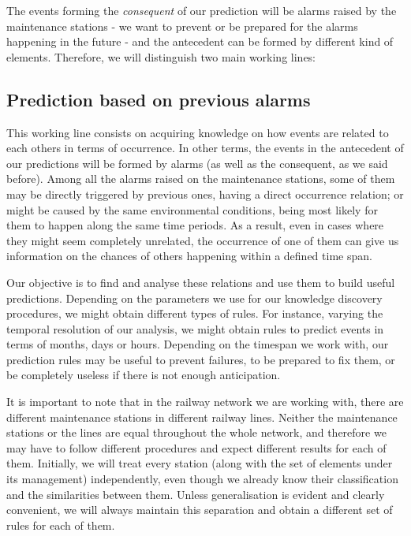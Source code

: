 \documentclass[a4paper,10pt]{report}
\begin{document}
The events forming the \emph{consequent} of our prediction will be alarms raised by the maintenance stations - we want to prevent or be prepared for the alarms happening in the future - and the antecedent can be formed by different kind of elements. Therefore, we will distinguish two main working lines:


\subsection{Prediction based on previous alarms}\label{sec:alarm-based-prediction}
This working line consists on acquiring knowledge on how events are related to each others in terms of occurrence. In other terms, the events in the antecedent of our predictions will be formed by alarms (as well as the consequent, as we said before). Among all the alarms raised on the maintenance stations, some of them may be directly triggered by previous ones, having a direct occurrence relation; or might be caused by the same environmental conditions, being most likely for them to happen along the same time periods. As a result, even in cases where they might seem completely unrelated, the occurrence of one of them can give us information on the chances of others happening within a defined time span.

Our objective is to find and analyse these relations and use them to build useful predictions. Depending on the parameters we use for our knowledge discovery procedures, we might obtain different types of rules. For instance, varying the temporal resolution of our analysis, we might obtain rules to predict events in terms of months, days or hours. Depending on the timespan we work with, our prediction rules may be useful to prevent failures, to be prepared to fix them, or be completely useless if there is not enough anticipation.

It is important to note that in the railway network we are working with, there are different maintenance stations in different railway lines. Neither the maintenance stations or the lines are equal throughout the whole network, and therefore we may have to follow different procedures and expect different results for each of them. Initially, we will treat every station (along with the set of elements under its management) independently, even though we already know their classification and the similarities between them. Unless generalisation is evident and clearly convenient, we will always maintain this separation and obtain a different set of rules for each of them.
\end{document}
